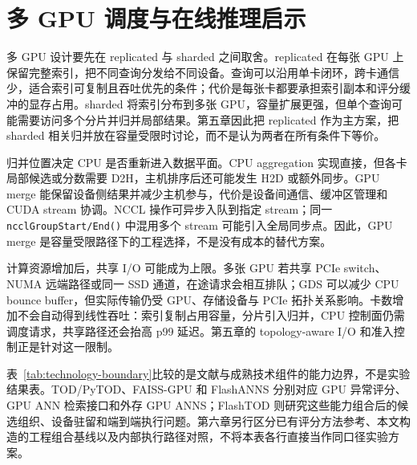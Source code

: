 \Needspace{0.35\textheight}
\section{多 GPU 调度与在线推理启示}

多 GPU 设计要先在 replicated 与 sharded 之间取舍。replicated 在每张 GPU 上保留完整索引，把不同查询分发给不同设备。查询可以沿用单卡闭环，跨卡通信少，适合索引可复制且吞吐优先的条件；代价是每张卡都要承担索引副本和评分缓冲的显存占用。sharded 将索引分布到多张 GPU，容量扩展更强，但单个查询可能需要访问多个分片并归并局部结果。第五章因此把 replicated 作为主方案，把 sharded 相关归并放在容量受限时讨论，而不是认为两者在所有条件下等价\citep{cuvs_multi_gpu_nn,cuvs_dist_mode}。

归并位置决定 CPU 是否重新进入数据平面。CPU aggregation 实现直接，但各卡局部候选或分数需要 D2H，主机排序后还可能发生 H2D 或额外同步。GPU merge 能保留设备侧结果并减少主机参与，代价是设备间通信、缓冲区管理和 CUDA stream 协调。NCCL 操作可异步入队到指定 stream；同一 \texttt{ncclGroupStart/End()} 中混用多个 stream 可能引入全局同步点\citep{nccl_stream_semantics}。因此，GPU merge 是容量受限路径下的工程选择，不是没有成本的替代方案。

计算资源增加后，共享 I/O 可能成为上限。多张 GPU 若共享 PCIe switch、NUMA 远端路径或同一 SSD 通道，在途请求会相互排队；GDS 可以减少 CPU bounce buffer，但实际传输仍受 GPU、存储设备与 PCIe 拓扑关系影响\citep{gds_overview,gds_design_guide,li2024multigpunuma}。卡数增加不会自动得到线性吞吐：索引复制占用容量，分片引入归并，CPU 控制面仍需调度请求，共享路径还会抬高 p99 延迟。第五章的 topology-aware I/O 和准入控制正是针对这一限制。

表~\ref{tab:technology-boundary}比较的是文献与成熟技术组件的能力边界，不是实验结果表。TOD/PyTOD、FAISS-GPU 和 FlashANNS 分别对应 GPU 异常评分、GPU ANN 检索接口和外存 GPU ANNS；FlashTOD 则研究这些能力组合后的候选组织、设备驻留和端到端执行问题。第六章另行区分已有评分方法参考、本文构造的工程组合基线以及内部执行路径对照，不将本表各行直接当作同口径实验方案。


